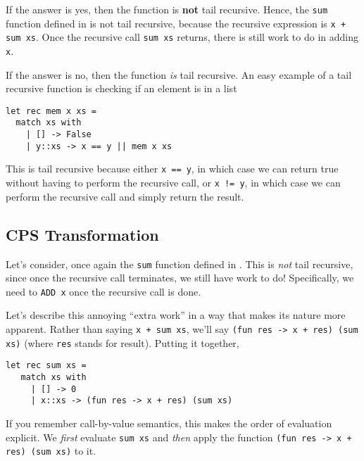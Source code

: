 If the answer is yes, then the function is \textbf{not} tail recursive. Hence, the \texttt{sum} function defined in  is not tail recursive, because the recursive expression is \texttt{x + sum xs}. Once the recursive call \texttt{sum xs} returns, there is still work to do in adding \texttt{x}.

If the answer is no, then the function \emph{is} tail recursive. An easy example of a tail recursive function is checking if an element is in a list

\begin{code}
\label{code:sum-cps-ocaml}
\begin{verbatim}
let rec mem x xs = 
  match xs with
    | [] -> False
    | y::xs -> x == y || mem x xs 
\end{verbatim}
\end{code}

This is tail recursive because either \texttt{x == y}, in which case we can return true without having to perform the recursive call, or \texttt{x != y}, in which case we can perform the recursive call and simply return the result. 

\subsection{CPS Transformation}
Let's consider, once again the \texttt{sum} function defined in . This is \emph{not} tail recursive, since once the recursive call terminates, we still have work to do! Specifically, we need to \texttt{ADD x} once the recursive call is done. 

Let's describe this annoying ``extra work'' in a way that makes its nature more apparent. Rather than saying \texttt{x + sum xs}, we'll say \texttt{(fun res -> x + res) (sum xs)} (where \texttt{res} stands for result). Putting it together, 

\begin{code}
\label{code:sum-ocaml}
\begin{verbatim}
let rec sum xs = 
   match xs with
     | [] -> 0
     | x::xs -> (fun res -> x + res) (sum xs)
\end{verbatim}
\end{code}

If you remember call-by-value semantics, this makes the order of evaluation explicit. We \emph{first} evaluate \texttt{sum xs} and \emph{then} apply the function \texttt{(fun res -> x + res) (sum xs)} to it. 

